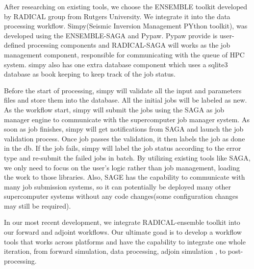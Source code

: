 After researching on existing tools, we choose the ENSEMBLE toolkit developed by RADICAL
group from Rutgers University. We integrate it into the data processing workflow.
Simpy(Seismic Inversion Management PYthon toolkit), was developed using the ENSEMBLE-SAGA
and Pypaw. Pypaw provide is user-defined processing components and RADICAL-SAGA will works as the 
job management component, responsible for communicating with the queue of HPC system.
simpy also has one extra database component which uses a sqlite3 database
as book keeping to keep track of the job status.

Before the start of processing,
simpy will validate all the input and parameters files and store them
into the database. All the initial jobs will be labeled as new.
As the workflow start, simpy will submit the jobs using the 
SAGA as job manager engine to communicate with the supercomputer job manager system.
As soon as job finishes, simpy will get notifications from
SAGA and launch the job validation process. Once job passes the validation,
it then labels the job as done in the db. If the job fails, simpy will label
the job status according to the error type and re-submit the failed jobs in batch.
By utilizing existing tools like SAGA, we only need to focus on the user's logic rather
than job management, loading the work to those libraries.
Also, SAGE has the capability to communicate with many job submission systems,
so it can potentially be deployed many other supercomputer systems without any
code changes(some configuration changes may still be required).

In our most recent development, we integrate RADICAL-ensemble toolkit
into our forward and adjoint workflows. Our ultimate
goad is to develop a workflow tools that works across platforms and have the capability to
integrate one whole iteration, from forward simulation, data processing, adjoin simulation
, to post-processing.